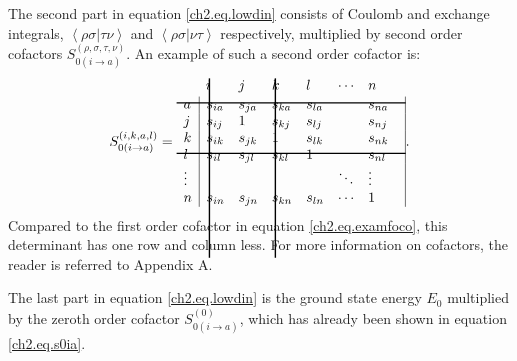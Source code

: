 The second part in equation \ref{ch2.eq.lowdin} consists of Coulomb and exchange integrals, $\left <\rho\sigma|\tau\nu \right >$ and $\left < \rho\sigma | \nu\tau \right>$ respectively, multiplied by second order cofactors $S_{0(i\rightarrow a)}^{(\rho,\sigma,\tau,\nu)}$. An example of such a second order cofactor is:
\begin{equation}
S_{0(i\rightarrow a)}^{(i,k,a,l)} =
\begin{array}{lllllll}
 &  \hskip 2.0 pt \hbox{\lower 120pt\hbox{\vrule height128pt width 1.0pt}}\hskip-3.0pt i & j & \hskip 2.0 pt \hbox{\lower 120pt\hbox{\vrule height128pt width 1.0pt}}\hskip-3.0pt k & l & \cdots & n \\
\noalign{\vskip-115pt}
 a &  \multicolumn{1}{|l}{s_{ia}} & s_{ja}  & s_{ka} & s_{la} & & \multicolumn{1}{l|}{ s_{na} } \\
 \noalign{\vskip-8pt}
\multispan7\hbox{\vrule  height 1.0 pt width164pt}\cr
\noalign{\vskip 7pt}
 j & \multicolumn{1}{|l}{s_{ij}} & 1 & s_{kj} & s_{lj} & & \multicolumn{1}{l|}{s_{nj}} \\
 k & \multicolumn{1}{|l}{s_{ik}} & s_{jk} & 1 & s_{lk} & & \multicolumn{1}{l|}{s_{nk}} \\
 l & \multicolumn{1}{|l}{s_{il}} & s_{jl} & s_{kl} & 1 & & \multicolumn{1}{l|}{s_{nl}} \\
 \noalign{\vskip-8pt}
\multispan7\hbox{\vrule  height 1.0 pt width164pt}\cr
\noalign{\vskip 7pt}
 \vdots & \multicolumn{1}{|l}{ } &   &   & & \ddots & \multicolumn{1}{l|}{\vdots} \\
 n & \multicolumn{1}{|l}{ s_{in}} & s_{jn} & s_{kn} & s_{ln} & \cdots & \multicolumn{1}{l|}{1}
\end{array}.\\
\label{ch2.eq.examsoco}
\end{equation}
Compared to the first order cofactor in equation \ref{ch2.eq.examfoco}, this determinant has one row and column less. For more information on cofactors, the reader is referred to Appendix A. 

The last part in equation \ref{ch2.eq.lowdin} is the ground state energy $E_0$ multiplied by the zeroth order cofactor $S_{0(i\rightarrow a)}^{(0)}$, which has already been shown in equation \ref{ch2.eq.s0ia}.

